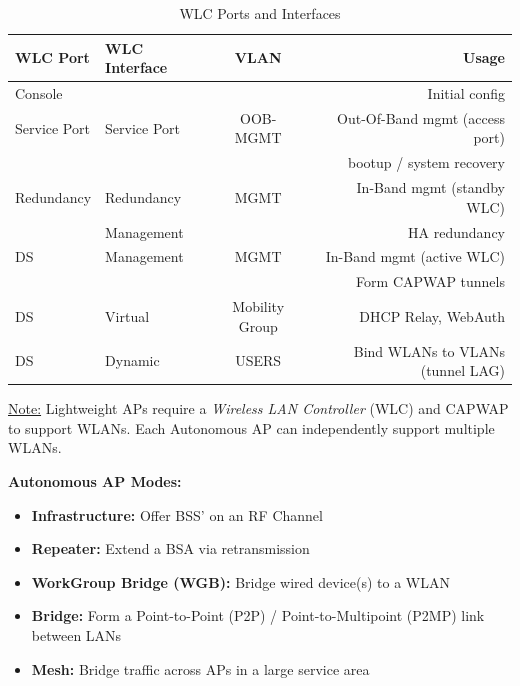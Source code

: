 \documentclass[12pt]{article}
\newif\ifcolor											%
\newcommand{\note}[1]{\ifcolor \colorbox{#1}{Note:}\else \underline{Note:}\fi}
\begin{document}
	\begin{table}[H]
	\centering
	\caption{WLC Ports and Interfaces \label{tab:WLC PORTS}}
	\begin{tabular}{@{} l l c r @{}}\hline
	\textbf{WLC Port}	& \textbf{WLC Interface}	& \textbf{VLAN}		& \textbf{Usage}\\\hline
	Console		&					&				& Initial config\\\hline
	Service Port		& Service Port			& OOB-MGMT		& Out-Of-Band mgmt (access port)\\
				&					&				& bootup / system recovery\\\hline
	Redundancy	& Redundancy			& MGMT			& In-Band mgmt (standby WLC)\\
				& Management			&				& HA redundancy\\\hline
	DS			& Management			& MGMT			& In-Band mgmt (active WLC)\\
				&					&				& Form CAPWAP tunnels\\\hline
	DS			& Virtual				& Mobility Group		& DHCP Relay, WebAuth\\\hline
	DS			& Dynamic				& USERS			& Bind WLANs to VLANs (tunnel LAG)\\\hline
	\end{tabular}\end{table}
	\note{Goldenrod} Lightweight APs require a \textit{Wireless LAN Controller} (WLC) and CAPWAP to support WLANs. Each Autonomous AP can independently support multiple WLANs.

	\textbf{Autonomous AP Modes:}
	\begin{itemize} \itemsep -5pt
		\label{itm:AUTONOMOUS AP}
		\item{\textbf{Infrastructure:} Offer BSS' on an RF Channel}
		\item{\textbf{Repeater:} Extend a BSA via retransmission}
		\item{\textbf{WorkGroup Bridge (WGB):} Bridge wired device(s) to a WLAN}
		\item{\textbf{Bridge:} Form a Point-to-Point (P2P) / Point-to-Multipoint (P2MP) link between LANs}
		\item{\textbf{Mesh:} Bridge traffic across APs in a large service area}
	\end{itemize}
\end{document}
